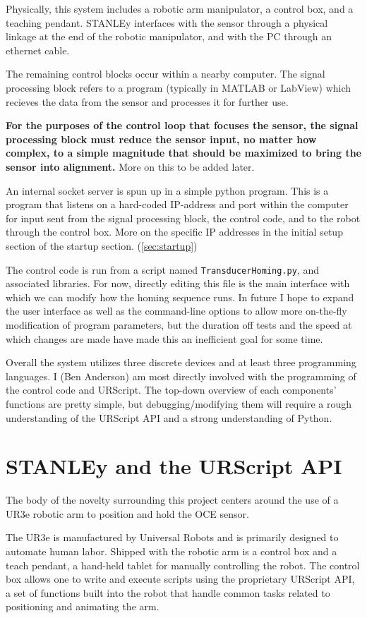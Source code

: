\documentclass[11pt]{article}
\begin{document}
Physically, this system includes a robotic arm manipulator, a control box, and a teaching pendant.
STANLEy interfaces with the sensor through a physical linkage at the end of the robotic manipulator, and with the PC through an ethernet cable.

The remaining control blocks occur within a nearby computer. The signal processing block refers to a program (typically in MATLAB or LabView) which recieves the data from the sensor and processes it for further use. 

\textbf{For the purposes of the control loop that focuses the sensor, the signal processing block must reduce the sensor input, no matter how complex, to a simple magnitude that should be maximized to bring the sensor into alignment.} More on this to be added later.

An internal socket server is spun up in a simple python program.
This is a program that listens on a hard-coded IP-address and port within the computer for input sent from the signal processing block, the control code, and to the robot through the control box.
More on the specific IP addresses in the initial setup section of the startup section. (\autoref{sec:startup})

The control code is run from a script named \texttt{TransducerHoming.py}, and associated libraries. For now, directly editing this file is the main interface with which we can modify how the homing sequence runs.
In future I hope to expand the user interface as well as the command-line options to allow more on-the-fly modification of program parameters, but the duration off tests and the speed at which changes are made have made this an inefficient goal for some time.

Overall the system utilizes three discrete devices and at least three programming languages. I (Ben Anderson) am most directly involved with the programming of the control code and URScript. The top-down overview of each components' functions are pretty simple, but debugging/modifying them will require a rough understanding of the URScript API and a strong understanding of Python.

\section{STANLEy and the URScript API}\label{sec:robot_summary}
The body of the novelty surrounding this project centers around the use of a UR3e robotic arm to position and hold the OCE sensor.

The UR3e is manufactured by Universal Robots and is primarily designed to automate human labor. Shipped with the robotic arm is a control box and a teach pendant, a hand-held tablet for manually controlling the robot. The control box allows one to write and execute scripts using the proprietary URScript API, a set of functions built into the robot that handle common tasks related to positioning and animating the arm.
\end{document}
